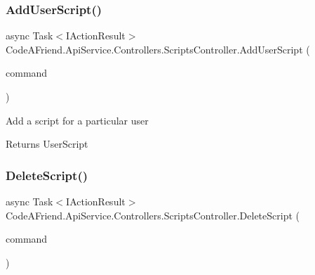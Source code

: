 \subsubsection{\texorpdfstring{Add\+User\+Script()}{AddUserScript()}}
{\footnotesize\ttfamily async Task$<$I\+Action\+Result$>$ Code\+A\+Friend.\+Api\+Service.\+Controllers.\+Scripts\+Controller.\+Add\+User\+Script (\begin{DoxyParamCaption}\item[{\mbox{\hyperlink{class_code_a_friend_1_1_data_model_1_1_user_1_1_add_script_command}{User.\+Add\+Script\+Command}}}]{command }\end{DoxyParamCaption})}



Add a script for a particular user 

\begin{DoxyReturn}{Returns}
User\+Script
\end{DoxyReturn}
\mbox{\label{class_code_a_friend_1_1_api_service_1_1_controllers_1_1_scripts_controller_a61268991951cf0238062fa5761971262}} 
\subsubsection{\texorpdfstring{Delete\+Script()}{DeleteScript()}}
{\footnotesize\ttfamily async Task$<$I\+Action\+Result$>$ Code\+A\+Friend.\+Api\+Service.\+Controllers.\+Scripts\+Controller.\+Delete\+Script (\begin{DoxyParamCaption}\item[{\mbox{\hyperlink{class_code_a_friend_1_1_data_model_1_1_user_1_1_delete_script_command}{User.\+Delete\+Script\+Command}}}]{command }\end{DoxyParamCaption})}






